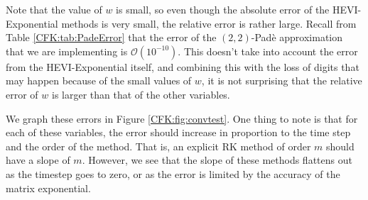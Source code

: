 \documentclass{csri19}
\begin{document}
Note that the value of $w$ is small, so even though the absolute error 
of the HEVI-Exponential methods is very small, the relative error is rather
 large. Recall from Table \ref{CFK:tab:PadeError} that the error of the 
$(2,2)$-Pad\`e approximation that we are implementing is $\mathcal{O}(10^{-10})$.
This doesn't take into account the error from the HEVI-Exponential itself, 
and combining this with the loss of digits that may happen because of the 
small values of $w$, it is not surprising that the relative error of $w$ is
larger than that of the other variables.

We graph these errors in Figure \ref{CFK:fig:convtest}. One thing to note
is that for each of these variables, the error should increase in 
proportion to the time step and the order of the method. That is, an 
explicit RK method of order $m$ should have a slope of $m$. However, we 
see that the slope of these methods flattens out as the timestep goes to 
zero, or as the error is limited by the accuracy of the matrix exponential.
\end{document}
